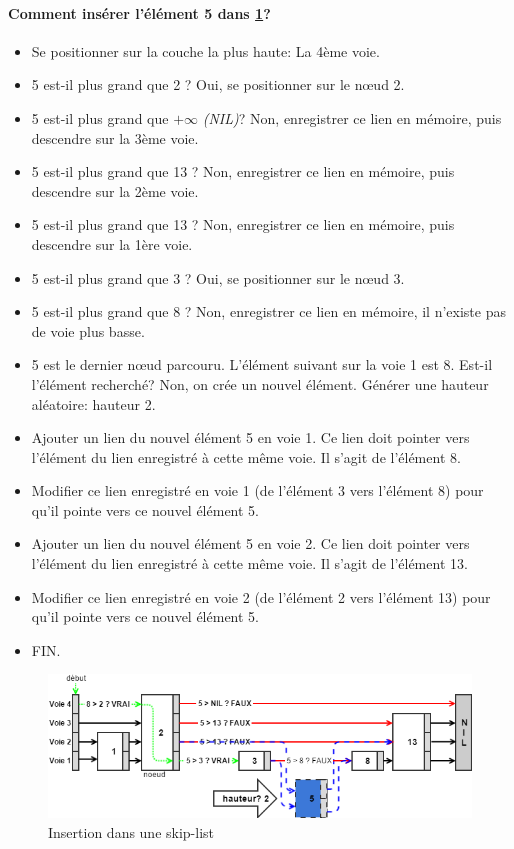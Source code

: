 \documentclass[hidelinks,a4paper, 12pt]{article}
\begin{document}
	\paragraph*{Comment insérer l'élément 5 dans \cref{SkipInsert2}?}
	\begin{itemize}
		\item Se positionner sur la couche la plus haute: La 4ème voie.
		\item 5 est-il plus grand que 2 ? Oui, se positionner sur le nœud 2.
		\item 5 est-il plus grand que $+\infty$ \textit{(NIL)}? Non, enregistrer ce lien en mémoire, puis descendre sur la 3ème voie.
		\item 5 est-il plus grand que 13 ? Non, enregistrer ce lien en mémoire, puis descendre sur la 2ème voie.
		\item 5 est-il plus grand que 13 ? Non, enregistrer ce lien en mémoire, puis descendre sur la 1ère voie.
		\item 5 est-il plus grand que 3 ? Oui, se positionner sur le nœud 3.
		\item 5 est-il plus grand que 8 ? Non, enregistrer ce lien en mémoire, il n'existe pas de voie plus basse.
		\item 5 est le dernier nœud parcouru. L'élément suivant sur la voie 1 est 8. Est-il l'élément recherché? Non, on crée un nouvel élément. Générer une hauteur aléatoire: hauteur 2.
		\item Ajouter un lien du nouvel élément 5 en voie 1. Ce lien doit pointer vers l'élément du lien enregistré à cette même voie. Il s'agit de l'élément 8.
		\item Modifier ce lien enregistré en voie 1 (de l'élément 3 vers l'élément 8) pour qu'il pointe vers ce nouvel élément 5.
		\item Ajouter un lien du nouvel élément 5 en voie 2. Ce lien doit pointer vers l'élément du lien enregistré à cette même voie. Il s'agit de l'élément 13.
		\item Modifier ce lien enregistré en voie 2 (de l'élément 2 vers l'élément 13) pour qu'il pointe vers ce nouvel élément 5.
		\item FIN.
	\end{itemize}
	\begin{figure}[h]
		\includegraphics[width=\textwidth]{img/insert2}
		\caption{Insertion dans une skip-list}
		\label{SkipInsert2}
	\end{figure}
	
\end{document}
